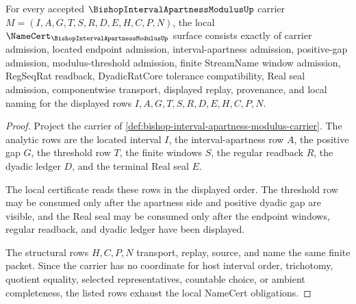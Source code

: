 \begin{theorem}
\label{thm:bishop-interval-apartness-modulus-namecert-obligations}
For every accepted $\BishopIntervalApartnessModulusUp$ carrier $M=(I,A,G,T,S,R,D,E,H,C,P,N)$, the local $\NameCert_{\BishopIntervalApartnessModulusUp}$ surface consists exactly of carrier admission, located endpoint admission, interval-apartness admission, positive-gap admission, modulus-threshold admission, finite StreamName window admission, RegSeqRat readback, DyadicRatCore tolerance compatibility, Real seal admission, componentwise transport, displayed replay, provenance, and local naming for the displayed rows $I,A,G,T,S,R,D,E,H,C,P,N$.
\end{theorem}
\begin{proof}
Project the carrier of \autoref{def:bishop-interval-apartness-modulus-carrier}. The analytic rows are the located interval $I$, the interval-apartness row $A$, the positive gap $G$, the threshold row $T$, the finite windows $S$, the regular readback $R$, the dyadic ledger $D$, and the terminal Real seal $E$.

The local certificate reads these rows in the displayed order. The threshold row may be consumed only after the apartness side and positive dyadic gap are visible, and the Real seal may be consumed only after the endpoint windows, regular readback, and dyadic ledger have been displayed.

The structural rows $H,C,P,N$ transport, replay, source, and name the same finite packet. Since the carrier has no coordinate for host interval order, trichotomy, quotient equality, selected representatives, countable choice, or ambient completeness, the listed rows exhaust the local NameCert obligations.
\end{proof}

